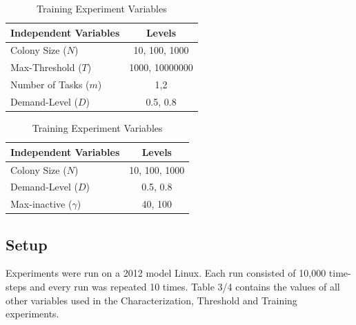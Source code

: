 \documentclass[a4paper]{article}
\begin{document}
\begin{table}
\caption{Independent Variables}\label{table:2}
\begin{subtable}[H]{3in}
\centering
  \begin{tabular}{ | l | c | }
    \hline
     \textbf{Independent Variables} &  \textbf{Levels}  \\ \hline
    Colony Size ($N$) & 10, 100, 1000 \\ \hline
    Max-Threshold ($T$) & 1000, 10000000 \\
    \hline
    Number of Tasks ($m$) & 1,2\\ \hline
    Demand-Level ($D$) &	0.5, 0.8 \\ \hline
  \end{tabular}
  \caption{Confirmation and Threshold Experiment Variables}\label{table:2a}
 \end {subtable}
\quad
\begin{subtable}[H]{3in}
\centering
\begin{tabular}{ | l | c | }
    \hline
     \textbf{Independent Variables} &  \textbf{Levels}  \\ \hline
    Colony Size ($N$) & 10, 100, 1000 \\ 
    \hline
    Demand-Level ($D$) &	0.5, 0.8 \\ \hline
    Max-inactive ($\gamma$) & 40, 100 \\
    \hline
  \end{tabular}
  \caption{Training Experiment Variables}\label{table:2b}
\end {subtable}
\end{table}


\subsection{Setup}

Experiments were run on a 2012 model Linux. Each run consisted of 10,000 time-steps and every run was repeated 10 times. Table 3/4 contains the values of all other variables used in the Characterization, Threshold and Training experiments.
\end{document}
